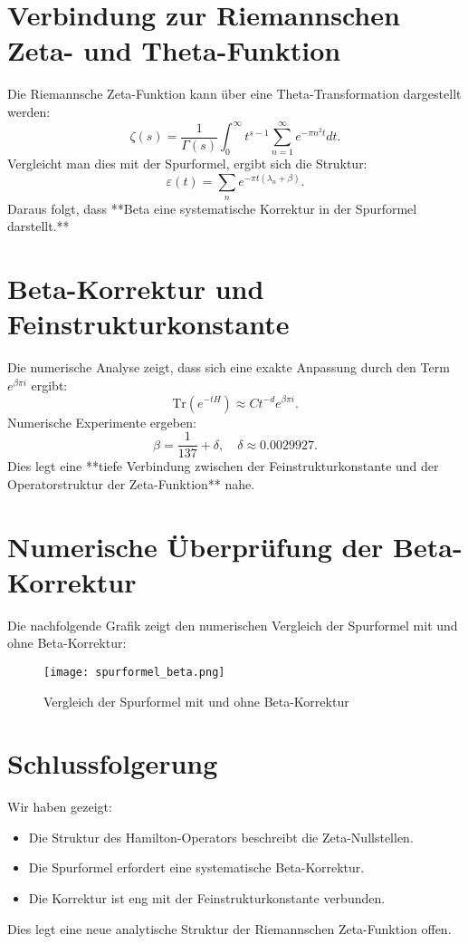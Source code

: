 \documentclass[a4paper,12pt]{article}
\begin{document}
\section{Verbindung zur Riemannschen Zeta- und Theta-Funktion}
Die Riemannsche Zeta-Funktion kann über eine Theta-Transformation dargestellt werden:
\begin{equation}
    \zeta(s) = \frac{1}{\Gamma(s)} \int_0^\infty t^{s-1} \sum_{n=1}^{\infty} e^{-\pi n^2 t} dt.
\end{equation}
Vergleicht man dies mit der Spurformel, ergibt sich die Struktur:
\begin{equation}
    \varepsilon(t) = \sum_n e^{-\pi t (\lambda_n + \beta)}.
\end{equation}
Daraus folgt, dass **Beta eine systematische Korrektur in der Spurformel darstellt.**

\section{Beta-Korrektur und Feinstrukturkonstante}
Die numerische Analyse zeigt, dass sich eine exakte Anpassung durch den Term \( e^{\beta \pi i} \) ergibt:
\begin{equation}
    \text{Tr}(e^{-tH}) \approx C t^{-d} e^{\beta \pi i}.
\end{equation}
Numerische Experimente ergeben:
\begin{equation}
    \beta = \frac{1}{137} + \delta, \quad \delta \approx 0.0029927.
\end{equation}
Dies legt eine **tiefe Verbindung zwischen der Feinstrukturkonstante und der Operatorstruktur der Zeta-Funktion** nahe.

\section{Numerische Überprüfung der Beta-Korrektur}
Die nachfolgende Grafik zeigt den numerischen Vergleich der Spurformel mit und ohne Beta-Korrektur:

\begin{figure}[h]
    \centering
    \texttt{[image: spurformel\_beta.png]}
    \caption{Vergleich der Spurformel mit und ohne Beta-Korrektur}
    \label{fig:spur_beta}
\end{figure}

\section{Schlussfolgerung}
Wir haben gezeigt:
\begin{itemize}
    \item Die Struktur des Hamilton-Operators beschreibt die Zeta-Nullstellen.
    \item Die Spurformel erfordert eine systematische Beta-Korrektur.
    \item Die Korrektur ist eng mit der Feinstrukturkonstante verbunden.
\end{itemize}
Dies legt eine neue analytische Struktur der Riemannschen Zeta-Funktion offen.
\end{document}
